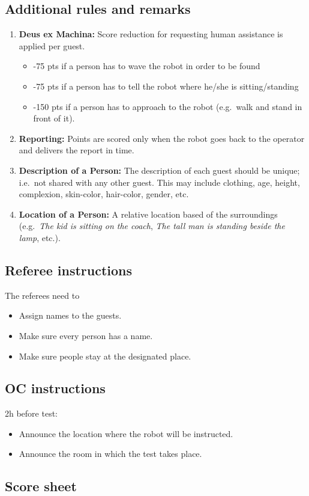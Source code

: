 \subsection*{Additional rules and remarks}
\begin{enumerate}[nosep]
	\item \textbf{Deus ex Machina:} Score reduction for requesting human assistance is applied per guest.
	\begin{itemize}
		\item -75 pts if a person has to wave the robot in order to be found
		\item -75 pts if a person has to tell the robot where he/she is sitting/standing
		\item -150 pts if a person has to approach to the robot (e.g.~walk and stand in front of it).
	\end{itemize}

	\item \textbf{Reporting:} Points are scored only when the robot goes back to the operator and delivers the report in time.

	\item \textbf{Description of a Person:} The description of each guest should be unique; i.e.~not shared with any other guest. This may include clothing, age, height, complexion, skin-color, hair-color, gender, etc.

	\item \textbf{Location of a Person:} A relative location based of the surroundings (e.g.~\textit{The kid is sitting on the coach}, \textit{The tall man is standing beside the lamp}, etc.).
\end{enumerate}


\subsection*{Referee instructions}

The referees need to
\begin{itemize}
	\item Assign names to the guests.
	\item Make sure every person has a name.
	\item Make sure people stay at the designated place.
\end{itemize}

\subsection*{OC instructions}

2h before test:
\begin{itemize}
	\item Announce the location where the robot will be instructed.
	\item Announce the room in which the test takes place.
\end{itemize}

\subsection*{Score sheet}

